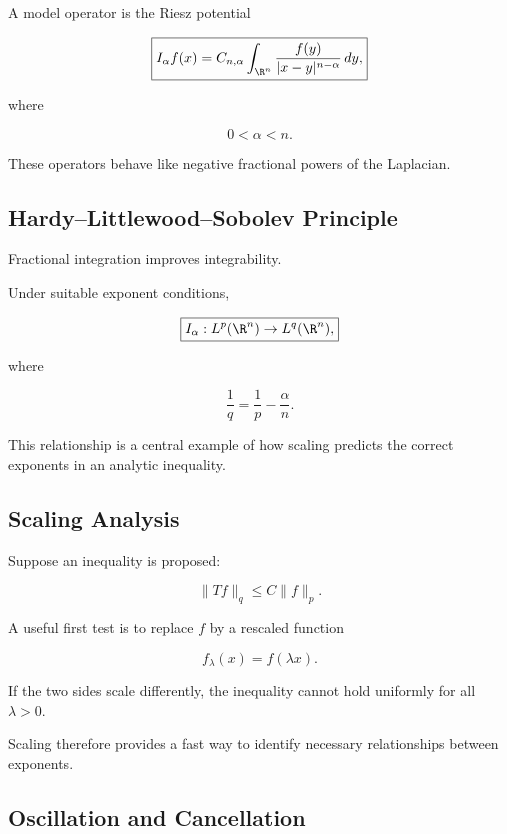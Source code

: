 A model operator is the Riesz potential

\[
\boxed{
I_\alpha f(x)
=
C_{n,\alpha}
\int_{\R^n}
\frac{f(y)}
{|x-y|^{n-\alpha}}
\,dy,
}
\]

where

\[
0<\alpha<n.
\]

These operators behave like negative fractional powers of the Laplacian.

\subsection{Hardy--Littlewood--Sobolev Principle}
\label{subsec:hls-principle}

Fractional integration improves integrability.

Under suitable exponent conditions,

\[
\boxed{
I_\alpha:L^p(\R^n)\to L^q(\R^n),
}
\]

where

\[
\boxed{
\frac1q
=
\frac1p-\frac{\alpha}{n}.
}
\]

This relationship is a central example of how scaling predicts the
correct exponents in an analytic inequality.

\subsection{Scaling Analysis}
\label{subsec:harmonic-scaling-analysis}

Suppose an inequality is proposed:

\[
\boxed{
\|Tf\|_q
\leq
C\|f\|_p.
}
\]

A useful first test is to replace \(f\) by a rescaled function

\[
f_\lambda(x)=f(\lambda x).
\]

If the two sides scale differently, the inequality cannot hold uniformly
for all \(\lambda>0\).

Scaling therefore provides a fast way to identify necessary relationships
between exponents.

\subsection{Oscillation and Cancellation}
\label{subsec:oscillation-cancellation}

